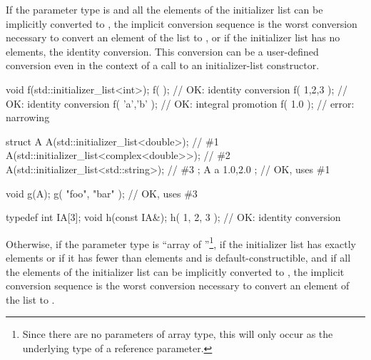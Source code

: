 \pnum
If the parameter type is 
and all the elements
of the initializer list can be implicitly converted to , the implicit
conversion sequence is the worst conversion necessary to convert an element of
the list to , or if the initializer list has no elements, the identity
conversion. This conversion can be a user-defined conversion even in
the context of a call to an initializer-list constructor. \enterexample
\begin{codeblock}
void f(std::initializer_list<int>);
f( {} );                    // OK:  identity conversion
f( {1,2,3} );               // OK:  identity conversion
f( {'a','b'} );             // OK:  integral promotion
f( {1.0} );                 // error: narrowing

struct A {
  A(std::initializer_list<double>);           // \#1
  A(std::initializer_list<complex<double>>);  // \#2
  A(std::initializer_list<std::string>);      // \#3
};
A a{ 1.0,2.0 };             // OK, uses \#1

void g(A);
g({ "foo", "bar" });        // OK, uses \#3

typedef int IA[3];
void h(const IA&);
h({ 1, 2, 3 });             // OK: identity conversion
\end{codeblock}
\exitexample

\pnum
Otherwise, if the parameter type is ``array of  ''\footnote{
Since there are
no parameters of array type, this will only occur as the underlying type of a reference
parameter.}, if the initializer list has exactly  elements or if it has fewer
than  elements and  is default-constructible, and if all the elements
of the initializer list can be implicitly converted to , the implicit
conversion sequence is the worst conversion necessary to convert an element of the list
to .

